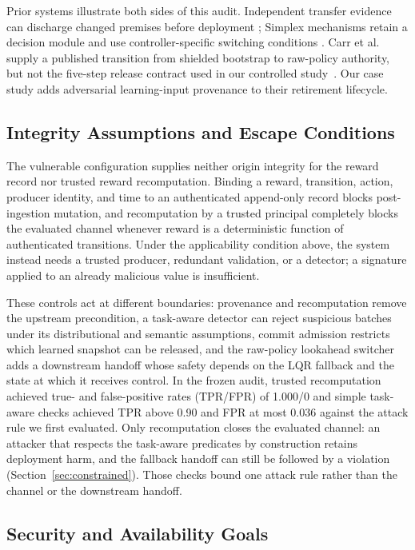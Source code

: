Prior systems illustrate both sides of this audit.  Independent transfer
evidence can discharge changed premises before deployment
\cite{hsu_sim_lab_real_2023}; Simplex mechanisms retain a decision module and
use controller-specific switching conditions
\cite{seto_simplex_1998,phan_neural_simplex_2020,damare_bb_simplex_2025}.
Carr et al. supply a published transition from shielded bootstrap to raw-policy
authority, but not the five-step release contract used in our controlled
study~\cite{carr_partial_shielding_2023}.  Our case study adds adversarial
learning-input provenance to their retirement lifecycle.

\subsection{Integrity Assumptions and Escape Conditions}

The vulnerable configuration supplies neither origin integrity for the reward
record nor trusted reward recomputation.  Binding a reward, transition,
action, producer identity, and time to an authenticated append-only record
blocks post-ingestion mutation, and recomputation by a trusted principal
completely blocks the evaluated channel whenever reward is a deterministic
function of authenticated transitions.  Under the applicability condition
above, the system instead needs a trusted producer, redundant validation, or a
detector; a signature applied to an already malicious value is insufficient.

These controls act at different boundaries: provenance and recomputation
remove the upstream precondition, a task-aware detector can reject suspicious
batches under its distributional and semantic assumptions, commit admission
restricts which learned snapshot can be released, and the raw-policy lookahead
switcher adds a downstream handoff whose safety depends on the LQR fallback and
the state at which it receives control.  In the frozen
audit, trusted recomputation achieved true- and false-positive rates (TPR/FPR) of
1.000/0 and simple task-aware checks achieved TPR above 0.90 and FPR at most
0.036 against the attack rule we first evaluated.  Only recomputation closes
the evaluated channel: an attacker that respects the task-aware predicates by
construction retains deployment harm, and the fallback handoff can still be
followed by a violation (Section~\ref{sec:constrained}).  Those checks bound one
attack rule rather than the channel or the downstream handoff.

\subsection{Security and Availability Goals}

